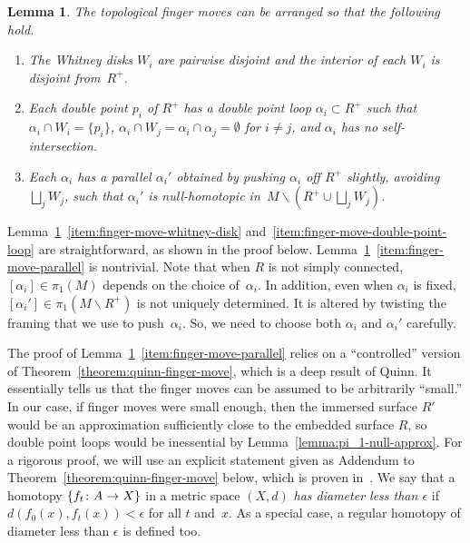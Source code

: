 \documentclass[11pt]{amsart}
\def\to{\mathchoice{\longrightarrow}{\rightarrow}{\rightarrow}{\rightarrow}}
\newtheorem{lemma}[theorem]{Lemma}
\theoremstyle{definition}
\theoremstyle{theorem-giventitle}
\theoremstyle{definition-giventitle}
\numberwithin{equation}{section}
\def\setminus{\smallsetminus}
\begin{document}
\begin{lemma}
  \label{lemma:finger-move-double-point-loops}
  The topological finger moves can be arranged so that the following hold.
  \begin{enumerate}
    \item\label{item:finger-move-whitney-disk} The Whitney disks $W_i$ are pairwise disjoint and the interior of each $W_i$ is disjoint from~$R^+$.
    \item\label{item:finger-move-double-point-loop} Each double point $p_i$ of $R^+$ has a double point loop $\alpha_i\subset R^+$ such that $\alpha_i\cap W_i=\{p_i\}$, $\alpha_i\cap W_j=\alpha_i\cap \alpha_j = \emptyset$ for $i\ne j$, and $\alpha_i$ has no self-intersection.
    \item\label{item:finger-move-parallel} Each $\alpha_i$ has a parallel $\alpha_i'$ obtained by pushing $\alpha_i$ off $R^+$ slightly, avoiding $\bigsqcup_j W_j$, such that $\alpha_i'$ is null-homotopic in~$M\setminus (R^+ \cup \bigsqcup_j W_j)$.
  \end{enumerate}
\end{lemma}

Lemma~\ref{lemma:finger-move-double-point-loops}~\ref{item:finger-move-whitney-disk} and~\ref{item:finger-move-double-point-loop} are straightforward, as shown in the proof below.
Lemma~\ref{lemma:finger-move-double-point-loops}~\ref{item:finger-move-parallel} is nontrivial.
Note that when $R$ is not simply connected, $[\alpha_i]\in \pi_1(M)$ depends on the choice of~$\alpha_i$.
In addition, even when $\alpha_i$ is fixed, $[\alpha_i']\in \pi_1(M\setminus R^+)$ is not uniquely determined.
It is altered by twisting the framing that we use to push~$\alpha_i$.
So, we need to choose both $\alpha_i$ and $\alpha_i'$ carefully.

The proof of Lemma~\ref{lemma:finger-move-double-point-loops}~\ref{item:finger-move-parallel} relies on a ``controlled'' version of Theorem~\ref{theorem:quinn-finger-move}, which is a deep result of Quinn.
It essentially tells us that the finger moves can be assumed to be arbitrarily ``small.''
In our case, if finger moves were small enough, then the immersed surface $R'$ would be an approximation sufficiently close to the embedded surface $R$, so double point loops would be inessential by Lemma~\ref{lemma:pi_1-null-approx}.
For a rigorous proof, we will use an explicit statement given as Addendum to Theorem~\ref{theorem:quinn-finger-move} below, which is proven in~\cite[8.1A, 7.2C and 7.1D]{Freedman-Quinn:1990-1}\@.
We say that a homotopy $\{f_t\colon A\to X\}$ in a metric space $(X,d)$ \emph{has diameter less than $\epsilon$} if $d(f_0(x),f_t(x))<\epsilon$ for all $t$ and~$x$.
As a special case, a regular homotopy of diameter less than $\epsilon$ is defined too.
\end{document}
